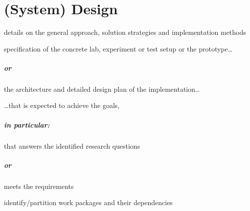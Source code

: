 \chapter{(System) Design}
\label{chp:design}


\begin{shaded}
\noindent details on the general approach, solution strategies and implementation methods

\vspace{5em}

\noindent specification of the concrete lab, experiment or test setup or the prototype\dots
\paragraph{or} the architecture and detailed design plan of the implementation\dots

\vspace{3em}

\noindent \dots that is expected to achieve the goals,
\paragraph{in particular:} that answers the identified research questions
\paragraph{or} meets the requirements

\vspace{5em}

\noindent identify/partition work packages and their dependencies
\end{shaded}


\lipsum[29-30]
